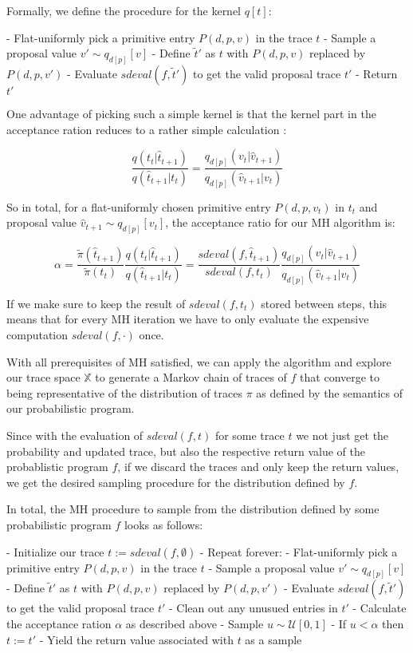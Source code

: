 Formally, we define the procedure for the kernel $q[t]$:

- Flat-uniformly pick a primitive entry $P(d,p,v)$ in the trace $t$
- Sample a proposal value $v' \sim q_{d[p]}[v]$
- Define $\tilde{t}'$ as $t$ with $P(d,p,v)$ replaced by $P(d,p,v')$
- Evaluate $sdeval(f,\tilde{t}')$ to get the valid proposal trace $t'$
- Return $t'$

One advantage of picking such a simple kernel is that the kernel part in the acceptance ration reduces to a rather simple calculation \cite{wingate2011lightweight}:

\begin{equation*}
\frac{q(t_t | \hat{t}_{t+1})}{q(\hat{t}_{t+1} | t_t)} = \frac{q_{d[p]}(v_t | \hat{v}_{t+1})}{q_{d[p]}(\hat{v}_{t+1} | v_t)}
\end{equation*}


So in total, for a flat-uniformly chosen primitive entry $P(d,p,v_t)$ in $t_t$ and proposal value $\hat{v}_{t+1} \sim q_{d[p]}[v_t]$, the acceptance ratio for our MH algorithm is:

\begin{equation*}
\alpha = \frac{\tilde{\pi}(\hat{t}_{t+1})}{\tilde{\pi}(t_t)} \frac{q(t_t | \hat{t}_{t+1})}{q(\hat{t}_{t+1} | t_t)} = \frac{sdeval(f, \hat{t}_{t+1})}{sdeval(f, t_t)} \frac{q_{d[p]}(v_t | \hat{v}_{t+1})}{q_{d[p]}(\hat{v}_{t+1} | v_t)}
\end{equation*}

If we make sure to keep the result of $sdeval(f, t_t)$ stored between steps, this means that for every MH iteration we have to only evaluate the expensive computation $sdeval(f, \cdot)$ once.

With all prerequisites of MH satisfied, we can apply the algorithm and explore our trace space $\mathbb{X}$ to generate a Markov chain of traces of $f$ that converge to being representative of the distribution of traces $\pi$ as defined by the semantics of our probabilistic program.

Since with the evaluation of $sdeval(f,t)$ for some trace $t$ we not just get the probability and updated trace, but also the respective return value of the probablistic program $f$, if we discard the traces and only keep the return values, we get the desired sampling procedure for the distribution defined by $f$.

In total, the MH procedure to sample from the distribution defined by some probabilistic program $f$ looks as follows:

- Initialize our trace $t := sdeval(f,\emptyset)$
- Repeat forever:
  - Flat-uniformly pick a primitive entry $P(d,p,v)$ in the trace $t$
  - Sample a proposal value $v' \sim q_{d[p]}[v]$
  - Define $\tilde{t}'$ as $t$ with $P(d,p,v)$ replaced by $P(d,p,v')$
  - Evaluate $sdeval(f,\tilde{t}')$ to get the valid proposal trace $t'$
  - Clean out any unusued entries in $t'$
  - Calculate the acceptance ration $\alpha$ as described above
  - Sample $u \sim \mathcal{U}[0,1]$
  - If $u < \alpha$ then $t := t'$
  - Yield the return value associated with $t$ as a sample